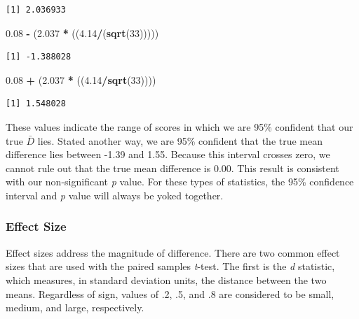 \documentclass[
  11pt,
]{book}
\newenvironment{Shaded}{\begin{snugshade}}{\end{snugshade}}
\newcommand{\DecValTok}[1]{\textcolor[rgb]{0.06,0.06,0.06}{#1}}
\newcommand{\FloatTok}[1]{\textcolor[rgb]{0.06,0.06,0.06}{#1}}
\newcommand{\FunctionTok}[1]{\textcolor[rgb]{0.27,0.27,0.27}{\textbf{#1}}}
\newcommand{\NormalTok}[1]{#1}
\newcommand{\SpecialCharTok}[1]{\textcolor[rgb]{0.43,0.43,0.43}{\textbf{#1}}}
\begin{document}
\begin{verbatim}
[1] 2.036933
\end{verbatim}

\begin{Shaded}
\begin{Highlighting}[]
\FloatTok{0.08} \SpecialCharTok{{-}}\NormalTok{ (}\FloatTok{2.037} \SpecialCharTok{*}\NormalTok{ ((}\FloatTok{4.14}\SpecialCharTok{/}\NormalTok{(}\FunctionTok{sqrt}\NormalTok{(}\DecValTok{33}\NormalTok{)))))}
\end{Highlighting}
\end{Shaded}

\begin{verbatim}
[1] -1.388028
\end{verbatim}

\begin{Shaded}
\begin{Highlighting}[]
\FloatTok{0.08} \SpecialCharTok{+}\NormalTok{ (}\FloatTok{2.037} \SpecialCharTok{*}\NormalTok{ ((}\FloatTok{4.14}\SpecialCharTok{/}\FunctionTok{sqrt}\NormalTok{(}\DecValTok{33}\NormalTok{))))}
\end{Highlighting}
\end{Shaded}

\begin{verbatim}
[1] 1.548028
\end{verbatim}

These values indicate the range of scores in which we are 95\% confident that our true \(\bar{D}\) lies. Stated another way, we are 95\% confident that the true mean difference lies between -1.39 and 1.55. Because this interval crosses zero, we cannot rule out that the true mean difference is 0.00. This result is consistent with our non-significant \emph{p} value. For these types of statistics, the 95\% confidence interval and \emph{p} value will always be yoked together.

\hypertarget{effect-size-2}{%
\subsubsection{Effect Size}\label{effect-size-2}}

Effect sizes address the magnitude of difference. There are two common effect sizes that are used with the paired samples \emph{t}-test. The first is the \emph{d} statistic, which measures, in standard deviation units, the distance between the two means. Regardless of sign, values of .2, .5, and .8 are considered to be small, medium, and large, respectively.
\end{document}
